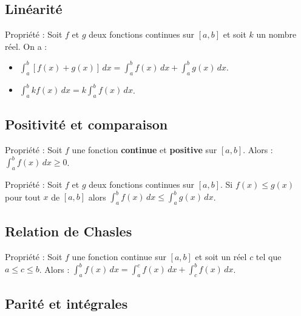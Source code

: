 \documentclass[11pt,a4paper]{article}
\begin{document}
\subsection{Linéarité}

\begin{boiteProp}{Propriété :}
    Soit $f$ et $g$ deux fonctions continues sur $[a,b]$ et soit $k$ un nombre réel.
    \newline
    On a :
    \begin{itemize}
        \item $\displaystyle \int_a^b [f(x) + g(x)] \, dx = \int_a^b f(x) \, dx + \int_a^b g(x) \, dx$.
        \item $\displaystyle \int_a^b k f(x) \, dx = k \int_a^b f(x) \, dx$.
    \end{itemize}
\end{boiteProp}

\subsection{Positivité et comparaison}

\begin{boiteProp}{Propriété :}
    Soit $f$ une fonction \textbf{continue} et \textbf{positive} sur $[a,b]$. 
    \newline
    Alors : $\displaystyle \int_a^b f(x) \, dx \geq 0$.
\end{boiteProp}

\begin{boiteProp}{Propriété :}
    Soit $f$ et $g$ deux fonctions continues sur $[a,b]$. 
    \newline
    Si $f(x) \leq g(x)$ pour tout $x$ de $[a,b]$ alors $\displaystyle \int_a^b f(x) \, dx \leq \int_a^b g(x) \, dx$.
\end{boiteProp}

\subsection{Relation de Chasles}

\begin{boiteProp}{Propriété :}
    Soit $f$ une fonction continue sur $[a,b]$ et soit un réel $c$ tel que $a \leq c \leq b$. 
    \newline
    Alors : $\displaystyle \int_a^b f(x) \, dx = \int_a^c f(x) \, dx + \int_c^b f(x) \,dx$.
\end{boiteProp}

\subsection{Parité et intégrales}
\end{document}

